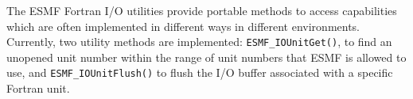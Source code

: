 
The ESMF Fortran I/O utilities provide portable methods to access
capabilities which are often implemented in different
ways in different environments.  Currently, two utility
methods are implemented: {\tt ESMF\_IOUnitGet()}, to find an unopened
unit number within the range of unit numbers that ESMF
is allowed to use, and {\tt ESMF\_IOUnitFlush()} to flush the
I/O buffer associated with a specific Fortran unit.
